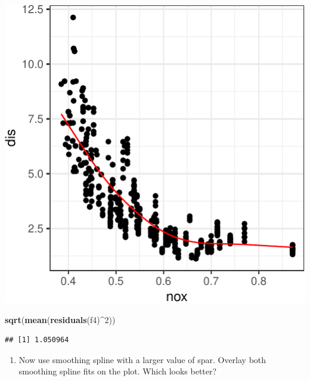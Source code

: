 \documentclass[]{article}
\newenvironment{Shaded}{\begin{snugshade}}{\end{snugshade}}
\newcommand{\DataTypeTok}[1]{\textcolor[rgb]{0.13,0.29,0.53}{#1}}
\newcommand{\DecValTok}[1]{\textcolor[rgb]{0.00,0.00,0.81}{#1}}
\newcommand{\KeywordTok}[1]{\textcolor[rgb]{0.13,0.29,0.53}{\textbf{#1}}}
\newcommand{\NormalTok}[1]{#1}
\newcommand{\OperatorTok}[1]{\textcolor[rgb]{0.81,0.36,0.00}{\textbf{#1}}}
\newcommand{\StringTok}[1]{\textcolor[rgb]{0.31,0.60,0.02}{#1}}
\providecommand{\tightlist}{%
  \setlength{\itemsep}{0pt}\setlength{\parskip}{0pt}}
\begin{document}
\begin{center}\includegraphics{sol_A4_files/figure-latex/unnamed-chunk-5-1} \end{center}

\begin{Shaded}
\begin{Highlighting}[]
\KeywordTok{sqrt}\NormalTok{(}\KeywordTok{mean}\NormalTok{(}\KeywordTok{residuals}\NormalTok{(f4)}\OperatorTok{^}\DecValTok{2}\NormalTok{))}
\end{Highlighting}
\end{Shaded}

\begin{verbatim}
## [1] 1.050964
\end{verbatim}

\begin{enumerate}
\def\labelenumi{(\alph{enumi})}
\setcounter{enumi}{6}
\tightlist
\item
  Now use smoothing spline with a larger value of spar. Overlay both
  smoothing spline fits on the plot. Which looks better?
\end{enumerate}

\begin{Shaded}
\end{Shaded}
\end{document}
